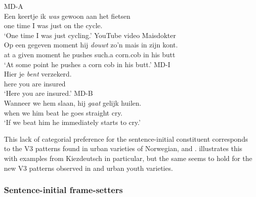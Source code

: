 \documentclass[output=paper]{langsci/langscibook}
\begin{document}
\ea
    \ea MD-A\label{exDP1}\\
    \gll Een keertje ik \textit{was} gewoon aan het fietsen\\
    one time I was just on the cycle.\Inf{}\\
    \trans \enquote*{One time I was just cycling.}
    \ex YouTube video Maisdokter\\
    \gll\label{exPP}Op een gegeven moment hij \textit{douwt} zo'n mais in zijn kont.\\
    at a given moment he pushes such.a corn.cob in his butt\\
    \trans \enquote*{At some point he pushes a corn cob in his butt.}
    \ex MD-I\\
    \gll\label{exAP}Hier je \textit{bent} verzekerd.\\
    here you are insured\\
    \trans \enquote*{Here you are insured.}
    \ex MD-B\\
    \gll\label{exCP}Wanneer we hem slaan, hij \textit{gaat} gelijk huilen.\\
    when we him beat he goes straight cry.\Inf{}\\
    \trans \enquote*{If we beat him he immediately starts to cry.}
    \z
\z

\noindent This lack of categorial preference for the sentence-initial
constituent corresponds to the V3 patterns found in urban varieties of
Norwegian,  and . \citet{Walkden:2017} illustrates this with
examples from Kiezdeutsch in particular, but the same seems to hold for the new
V3 patterns observed in  and  urban youth varieties.

\subsubsection{Sentence-initial frame-setters}
\end{document}
